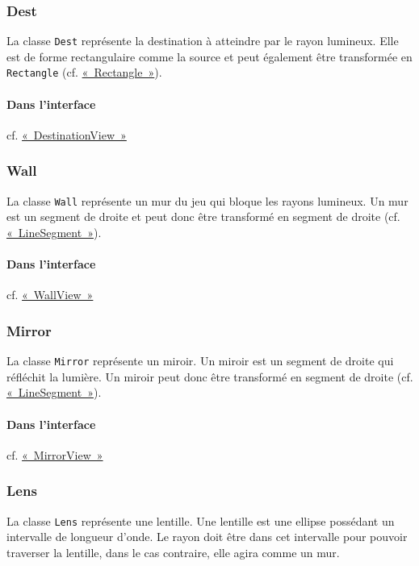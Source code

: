 \documentclass[]{report}
\begin{document}
\subsubsection{\label{Dest}Dest}

La classe \texttt{Dest} représente la destination à atteindre par 
le rayon lumineux. Elle est de forme rectangulaire comme la source
et peut également être transformée en \texttt{Rectangle} (cf. \hyperref[Rectangle]{«~Rectangle~»}).

\paragraph{Dans l'interface} cf. \hyperref[DestinationView]{«~DestinationView~»}

\subsubsection{\label{Wall}Wall}

La classe \texttt{Wall} représente un mur du jeu qui bloque les rayons
lumineux. Un mur est un segment de droite et peut donc être transformé 
en segment de droite (cf. \hyperref[LineSegment]{«~LineSegment~»}).

\paragraph{Dans l'interface} cf. \hyperref[WallView]{«~WallView~»}

\subsubsection{\label{Mirror}Mirror}

La classe \texttt{Mirror} représente un miroir. Un miroir
est un segment de droite qui réfléchit la lumière.
Un miroir peut donc être transformé en 
segment de droite (cf. \hyperref[LineSegment]{«~LineSegment~»}).

\paragraph{Dans l'interface} cf. \hyperref[MirrorView]{«~MirrorView~»}

\subsubsection{\label{Lens}Lens}

La classe \texttt{Lens} représente une lentille. Une lentille est
une ellipse possédant un intervalle de longueur d'onde. Le rayon doit
être dans cet intervalle pour pouvoir traverser la lentille, dans le cas
contraire, elle agira comme un mur.
\end{document}
